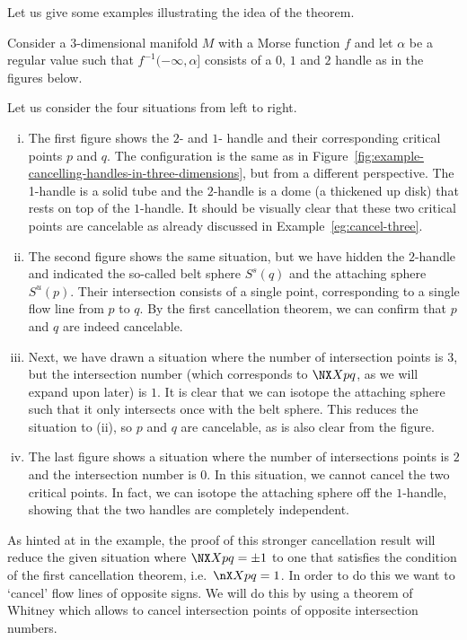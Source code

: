 Let us give some examples illustrating the idea of the theorem.
\begin{eg}
    Consider a $3$-dimensional manifold $M$ with a Morse function $f$ and let $\alpha$ be a regular value such that  $f^{-1}(-\infty, \alpha]$ consists of a $0$, $1$ and  $2$ handle as in the figures below.
    \begin{figure}[H]
    \centering
\end{figure}
    Let us consider the four situations from left to right.
    \begin{enumerate}[(i)]
        \item The first figure shows the $2$- and  $1$- handle and their corresponding critical points $p$ and  $q$.
            The configuration is the same as in Figure~\ref{fig:example-cancelling-handles-in-three-dimensions}, but from a different perspective.
            The 1-handle is a solid tube and the $2$-handle is a dome (a thickened up disk) that rests on top of the $1$-handle.
            It should be visually clear that these two critical points are cancelable as already discussed in Example~\ref{eg:cancel-three}.

        \item The second figure shows the same situation, but we have hidden the $2$-handle and indicated the so-called belt sphere $S^{s}(q)$ and the attaching sphere $S^{u}(p)$. Their intersection consists of a single point, corresponding to a single flow line from $p$ to $q$. 
            By the first cancellation theorem, we can confirm that $p$ and  $q$ are indeed cancelable.
        \item Next, we have drawn a situation where the number of intersection points is $3$, but the intersection number (which corresponds to $\NX Xpq$, as we will expand upon later) is $1$. It is clear that we can isotope the attaching sphere such that it only intersects once with the belt sphere.
            This reduces the situation to (ii), so $p$ and  $q$ are cancelable, as is also clear from the figure. 
        \item The last figure shows a situation where the number of intersections points is $2$ and the intersection number is $0$. In this situation, we cannot cancel the two critical points. In fact, we can isotope the attaching sphere off the $1$-handle, showing that the two handles are completely independent.
    \end{enumerate}
\end{eg}
As hinted at in the example, the proof of this stronger cancellation result will reduce the given situation where $\NX X pq = \pm 1$ to one that satisfies the condition of the first cancellation theorem, i.e.\ $\nX X pq = 1$.
In order to do this we want to `cancel' flow lines of opposite signs.
We will do this by using a theorem of Whitney which allows to cancel intersection points of opposite intersection numbers.

